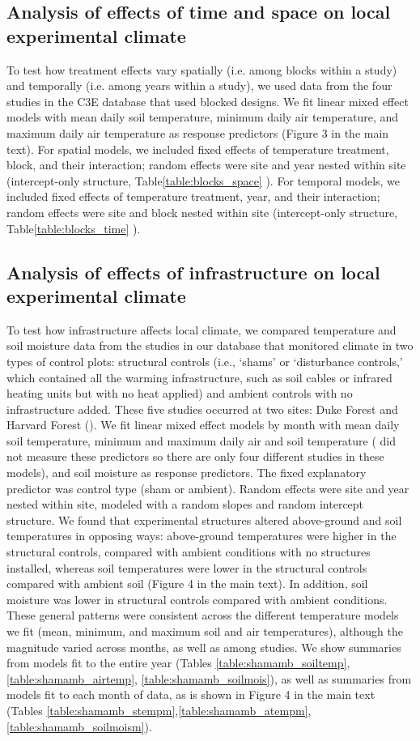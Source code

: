 \documentclass{article}
\begin{document}
\subsection* {Analysis of effects of time and space on local experimental climate}
To test how treatment effects vary spatially (i.e. among blocks within a study) and temporally (i.e. among years within a study), we used data from the four studies in the C3E database that used blocked designs. We fit linear mixed effect models with mean daily soil temperature, minimum daily air temperature, and maximum daily air temperature as response predictors (Figure 3 in the main text). For spatial models, we included fixed effects of temperature treatment, block, and their interaction; random effects were site and year nested within site (intercept-only structure, Table\ref{table:blocks_space}
).  For temporal models, we included fixed effects of temperature treatment, year, and their interaction; random effects were site and block nested within site (intercept-only structure, Table\ref{table:blocks_time}
). 
\subsection* {Analysis of effects of infrastructure on local experimental climate}
To test how infrastructure affects local climate, we compared temperature and soil moisture data from the studies in our database that
monitored climate in two types of control plots: structural controls (i.e., `shams' or `disturbance controls,'
which contained all the warming infrastructure, such as soil cables or infrared heating units but with no heat
applied) and ambient controls with no infrastructure added. These five studies occurred at two sites: Duke Forest and Harvard Forest (\citep{farnsworth1995,clark20141,marchin2015,pelini2011}). We fit linear mixed effect models by month with mean daily soil temperature, minimum and maximum daily air and soil temperature (\citep{farnsworth1995} did not measure these predictors so there are only four different studies in these models), and soil moisture as response predictors. The fixed explanatory predictor was control type (sham or ambient). Random effects were site and year nested within site, modeled with a random slopes and random intercept structure. 
We found that experimental structures altered above-ground and soil temperatures in opposing ways: above-ground
temperatures were higher in the structural controls, compared with ambient conditions with no
structures installed, whereas soil temperatures were lower in the structural controls compared with ambient
soil (Figure 4 in the main text).  In addition, soil moisture was lower in
structural controls compared with ambient conditions. These general patterns were consistent across the different temperature models we fit (mean,
minimum, and maximum soil and air temperatures), although the magnitude varied across months, as well
as among studies. We show summaries from models fit to the entire year (Tables \ref{table:shamamb_soiltemp},\ref{table:shamamb_airtemp}, \ref{table:shamamb_soilmois}), as well as summaries from models fit to each month of data, as is shown in Figure 4 in the main text (Tables \ref{table:shamamb_stempm},\ref{table:shamamb_atempm}, \ref{table:shamamb_soilmoism}).
\end{document}
